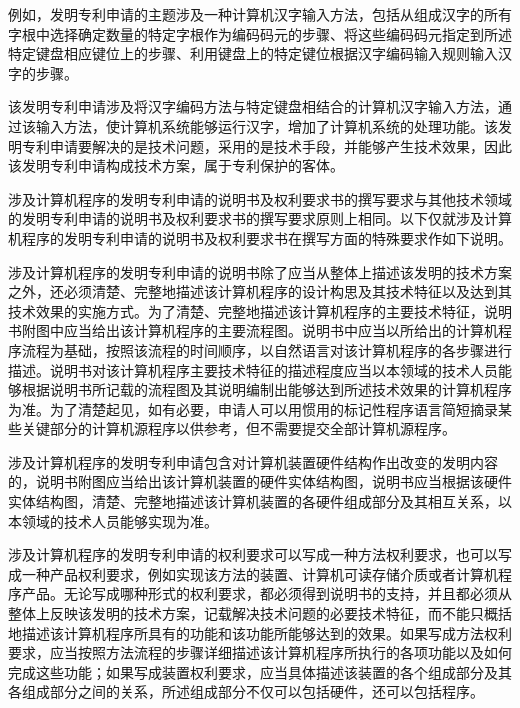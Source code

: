 例如，发明专利申请的主题涉及一种计算机汉字输入方法，包括从组成汉字的所有字根中选择确定数量的特定字根作为编码码元的步骤、将这些编码码元指定到所述特定键盘相应键位上的步骤、利用键盘上的特定键位根据汉字编码输入规则输入汉字的步骤。

该发明专利申请涉及将汉字编码方法与特定键盘相结合的计算机汉字输入方法，通过该输入方法，使计算机系统能够运行汉字，增加了计算机系统的处理功能。该发明专利申请要解决的是技术问题，采用的是技术手段，并能够产生技术效果，因此该发明专利申请构成技术方案，属于专利保护的客体。

涉及计算机程序的发明专利申请的说明书及权利要求书的撰写要求与其他技术领域的发明专利申请的说明书及权利要求书的撰写要求原则上相同。以下仅就涉及计算机程序的发明专利申请的说明书及权利要求书在撰写方面的特殊要求作如下说明。

涉及计算机程序的发明专利申请的说明书除了应当从整体上描述该发明的技术方案之外，还必须清楚、完整地描述该计算机程序的设计构思及其技术特征以及达到其技术效果的实施方式。为了清楚、完整地描述该计算机程序的主要技术特征，说明书附图中应当给出该计算机程序的主要流程图。说明书中应当以所给出的计算机程序流程为基础，按照该流程的时间顺序，以自然语言对该计算机程序的各步骤进行描述。说明书对该计算机程序主要技术特征的描述程度应当以本领域的技术人员能够根据说明书所记载的流程图及其说明编制出能够达到所述技术效果的计算机程序为准。为了清楚起见，如有必要，申请人可以用惯用的标记性程序语言简短摘录某些关键部分的计算机源程序以供参考，但不需要提交全部计算机源程序。

涉及计算机程序的发明专利申请包含对计算机装置硬件结构作出改变的发明内容的，说明书附图应当给出该计算机装置的硬件实体结构图，说明书应当根据该硬件实体结构图，清楚、完整地描述该计算机装置的各硬件组成部分及其相互关系，以本领域的技术人员能够实现为准。

{\setlength{\parindent}{20.6bp}涉及计算机程序的发明专利申请的权利要求可以写成一种方法权利要求，也可以写成一种产品权利要求，例如实现该方法的装置、计算机可读存储介质或者计算机程序产品。无论写成哪种形式的权利要求，都必须得到说明书的支持，并且都必须从整体上反映该发明的技术方案，记载解决技术问题的必要技术特征，而不能只概括地描述该计算机程序所具有的功能和该功能所能够达到的效果。如果写成方法权利要求，应当按照方法流程的步骤详细描述该计算机程序所执行的各项功能以及如何完成这些功能；如果写成装置权利要求，应当具体描述该装置的各个组成部分及其各组成部分之间的关系，所述组成部分不仅可以包括硬件，还可以包括程序。\par}

